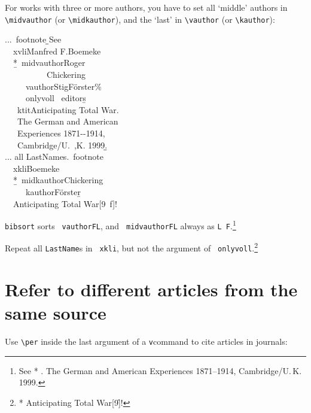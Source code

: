 \documentclass[12pt,a4paper]{article}
\newcommand{\pbs}{\string\ \unskip}
\newcommand{\bs}{\protect\pbs}
\renewcommand{\{}{{\normalfont\lbashortmem}}
\renewcommand{\}}{{\normalfont\rbashortmem}}
\begin{document}
 \newpage
 \noindent 
 For works with three or more authors, you have to set all `middle' authors
 in \verb|\midvauthor| (or \verb|\midkauthor|), and the `last' in
 \verb|\vauthor| (or \verb|\kauthor|):

 \vspace{-.125ex}
\Doppelbox
 {
   ...\bs footnote \b{\b{\{}}See
   \\ \ \bs xvli\{Manfred F.\}\{Boemeke\}
   \\ \ \ *\b{\{}\bs midvauthor\{Roger\}
   \\ \ \ \ \ \ \ \ \ \ \ \{Chickering\} 
   \\ \ \ \ \ \bs vauthor\{Stig\}\{Förster\}\%
   \\ \ \ \ \ \bs onlyvoll\{ \bs editors\}\b{\}}
   \\[.2ex] \ \ \{\bs ktit\{Anticipating Total War\}. 
   \\ \ \ \ The German and American 
   \\ \ \ \ Experiences 1871-{}-1914, 
   \\ \ \ \ Cambridge/U.\bs,K. 1999\}.\b{\b{\}}}
   \\[.275ex]
   ... all LastNames.\bs footnote \{
   \\ \ \bs xkli\{Boemeke\}
   \\ \ \ *\b{\{}\bs midkauthor\{Chickering\} 
   \\ \ \ \ \ \bs kauthor\{Förster\}\b{\}}
   \\ \ \ \{Anticipating Total War\}[9\bs f]!\}
 }
 {
   \texttt{bibsort} sorts \texttt{\bs vauthor\{F\}\{L\}}, 
   and \texttt{\bs midvauthor\{F\}\{L\}} always as \texttt{L F}.\footnote {See
   *{ 
         \onlyvoll{ \editors}}{. 
   The German and American Experiences 1871--1914, Cambridge/U.\,K. 1999}.}

   Repeat all \texttt{LastName}s in \texttt{\bs xkli}, but not the argument
   of \texttt{\bs onlyvoll}.\footnote
   {*{ }
   {Anticipating Total War}[9\f]!}
 }


\vspace{-1ex}
\section{Refer to different articles from the same source}
 
\vspace{-.75ex}
Use \verb|\per| inside the last argument of a \texttt{v}\fhy command to cite articles in journals:
\end{document}
